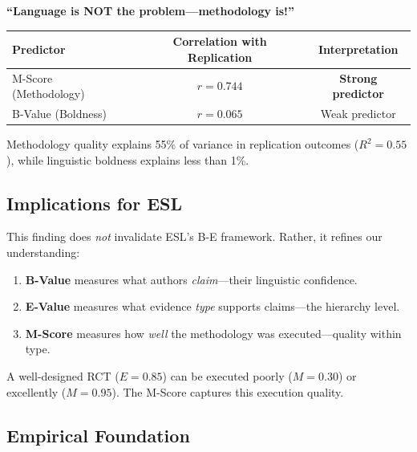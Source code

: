 \documentclass[11pt,a4paper]{article}
\begin{document}
\begin{keyinsight}[title={The Central Discovery}]
\textbf{``Language is NOT the problem---methodology is!''}

\begin{center}
\begin{tabular}{lcc}
\toprule
\textbf{Predictor} & \textbf{Correlation with Replication} & \textbf{Interpretation} \\
\midrule
M-Score (Methodology) & $r = 0.744$ & \textbf{Strong predictor} \\
B-Value (Boldness) & $r = 0.065$ & Weak predictor \\
\bottomrule
\end{tabular}
\end{center}

Methodology quality explains 55\% of variance in replication outcomes ($R^2 = 0.55$), while linguistic boldness explains less than 1\%.
\end{keyinsight}

\subsection{Implications for ESL}

This finding does \textit{not} invalidate ESL's B-E framework. Rather, it refines our understanding:

\begin{enumerate}
    \item \textbf{B-Value} measures what authors \textit{claim}---their linguistic confidence.
    \item \textbf{E-Value} measures what evidence \textit{type} supports claims---the hierarchy level.
    \item \textbf{M-Score} measures how \textit{well} the methodology was executed---quality within type.
\end{enumerate}

A well-designed RCT ($E = 0.85$) can be executed poorly ($M = 0.30$) or excellently ($M = 0.95$). The M-Score captures this execution quality.

\subsection{Empirical Foundation}
\end{document}
